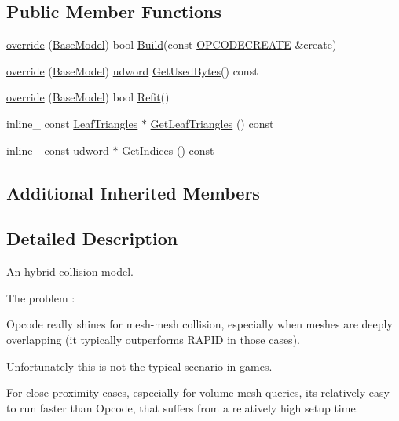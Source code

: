 \subsection*{Public Member Functions}
\begin{DoxyCompactItemize}
\item 
\hyperlink{classHybridModel_aa59380d7035b6ba66ee39247de24609e}{override} (\hyperlink{classBaseModel}{Base\+Model}) bool \hyperlink{classBaseModel_ab2692ac2ec9c0c8c452d73f3a0bd341b}{Build}(const \hyperlink{structOPCODECREATE}{O\+P\+C\+O\+D\+E\+C\+R\+E\+A\+TE} \&create)
\item 
\hyperlink{classHybridModel_aad99f00881d448709249cf5959dd1f3a}{override} (\hyperlink{classBaseModel}{Base\+Model}) \hyperlink{IceTypes_8h_a44c6f1920ba5551225fb534f9d1a1733}{udword} \hyperlink{classBaseModel_a714251e9cd861e4e304f5740c75a5b74}{Get\+Used\+Bytes}() const 
\item 
\hyperlink{classHybridModel_ab624c7cb773f7dd2c614fe9b8c00d02a}{override} (\hyperlink{classBaseModel}{Base\+Model}) bool \hyperlink{classBaseModel_a5776072914754d8ba95856d27ce24a6d}{Refit}()
\item 
inline\+\_\+ const \hyperlink{structLeafTriangles}{Leaf\+Triangles} $\ast$ \hyperlink{classHybridModel_ae7c97d3ab7a1656125593cfdd641bebe}{Get\+Leaf\+Triangles} () const 
\item 
inline\+\_\+ const \hyperlink{IceTypes_8h_a44c6f1920ba5551225fb534f9d1a1733}{udword} $\ast$ \hyperlink{classHybridModel_a641aa5899ef8db31d9d18cbdf8ca50b7}{Get\+Indices} () const 
\end{DoxyCompactItemize}
\subsection*{Additional Inherited Members}


\subsection{Detailed Description}
An hybrid collision model.

The problem \+:

Opcode really shines for mesh-\/mesh collision, especially when meshes are deeply overlapping (it typically outperforms R\+A\+P\+ID in those cases).

Unfortunately this is not the typical scenario in games.

For close-\/proximity cases, especially for volume-\/mesh queries, it\textquotesingle{}s relatively easy to run faster than Opcode, that suffers from a relatively high setup time.

